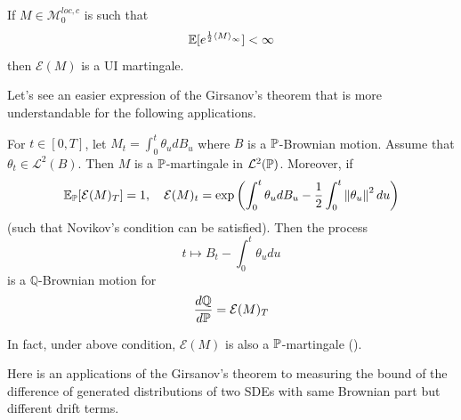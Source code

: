 \documentclass[a4paper,12pt]{article}
\begin{document}
\begin{thm}
  If $M \in \mathcal{M}_0^{loc,c}$ is such that
  \begin{equation*}
    \mathbb{E}[e^{\frac{1}{2}\left\langle M \right\rangle_\infty}] < \infty
  \end{equation*}
  then $\mathcal{E}(M)$ is a UI martingale.
\end{thm}

Let's see an easier expression of the Girsanov's theorem that is more understandable for the following applications.
\begin{thm}\label{thm1}
  For $t \in [0,T]$, let $M_t = \int_0^t \theta_u dB_u$ where $B$ is a $\mathbb{P}$-Brownian motion. Assume that $\theta_t \in \mathcal{L}^2(B)$. Then $M$ is a $\mathbb{P}$-martingale in $\mathcal{L}^2(\mathbb{P})$. Moreover, if
  \begin{equation*}
    \mathbb{E}_{\mathbb{P}}[\mathcal{E}(M)_T] = 1,\quad \mathcal{E}(M)_t = \exp\left(\int_0^t\theta_u dB_u - \frac{1}{2}\int_0^t\left\lVert\theta_u\right\lVert^2du\right)
  \end{equation*}
  (such that Novikov’s condition can be satisfied). Then the process
  \begin{equation*}
    t \mapsto B_t - \int_0^t\theta_u du
  \end{equation*}
  is a $\mathbb{Q}$-Brownian motion for
  \begin{equation*}
    \frac{d\mathbb{Q}}{d\mathbb{P}} = \mathcal{E}(M)_T
  \end{equation*}
\end{thm}
\begin{rmk}
  In fact, under above condition, $\mathcal{E}(M)$ is also a $\mathbb{P}$-martingale (\cite{le2016brownian}).
\end{rmk}

Here is an applications of the Girsanov's theorem to measuring the bound of the difference of generated distributions of two SDEs with same Brownian part but different drift terms. 
      
\end{document}

